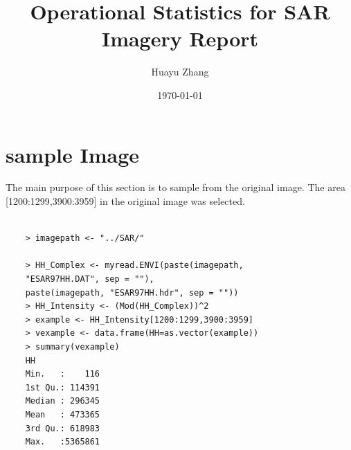 \documentclass{article}
\title{Operational Statistics for SAR Imagery Report}
\author{Huayu Zhang}
\date\today
\begin{document}
	\maketitle
	\section{sample Image} 
	The main purpose of this section is to sample from the original image. The area [1200:1299,3900:3959] in the original image was selected.
	\begin{lstlisting}[frame=tb]
	
	> imagepath <- "../SAR/"
	
	> HH_Complex <- myread.ENVI(paste(imagepath,
	"ESAR97HH.DAT", sep = ""), 
	paste(imagepath, "ESAR97HH.hdr", sep = ""))
	> HH_Intensity <- (Mod(HH_Complex))^2
	> example <- HH_Intensity[1200:1299,3900:3959]
	> vexample <- data.frame(HH=as.vector(example))
	> summary(vexample)
	HH          
	Min.   :    116  
 	1st Qu.: 114391  
 	Median : 296345  
 	Mean   : 473365  
 	3rd Qu.: 618983  
 	Max.   :5365861  
	\end{lstlisting}
	\begin{figure}[htbp]
		\centering
		\quad
		\quad
	\end{figure}
	
\end{document}
